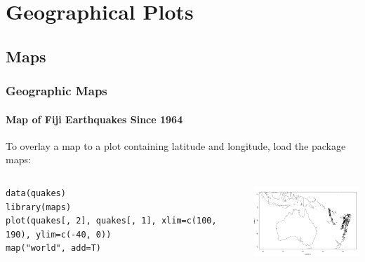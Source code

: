 

\section[Geographical Plots]{Geographical Plots}
\subsection{Maps}

\begin{frame}[fragile]
\frametitle{Geographic Maps}
  \framesubtitle{Map of Fiji Earthquakes Since 1964}

To overlay a map to a plot containing latitude and longitude, load the package \ttfamily maps: \normalfont 
    \begin{columns}
\begin{lstlisting}
data(quakes)
library(maps)
plot(quakes[, 2], quakes[, 1], xlim=c(100, 190), ylim=c(-40, 0))
map("world", add=T)
\end{lstlisting}

       \begin{center}
\includegraphics[width = 55mm]{images/Fuji.pdf}
\end{center}
\end{columns}
\end{frame}

